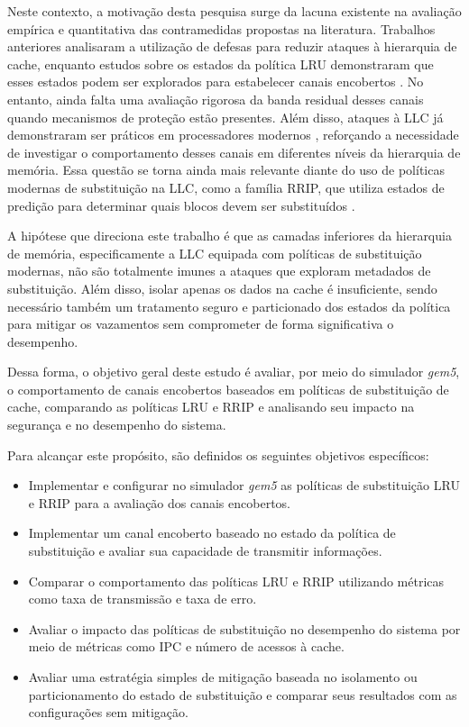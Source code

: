 \documentclass[12pt]{article}
\begin{document}
Neste contexto, a motivação desta pesquisa surge da lacuna existente na avaliação empírica e quantitativa das contramedidas propostas na literatura. Trabalhos anteriores analisaram a utilização de defesas para reduzir ataques à hierarquia de cache, enquanto estudos sobre os estados da política LRU demonstraram que esses estados podem ser explorados para estabelecer canais encobertos \cite{9354935,9065598}. No entanto, ainda falta uma avaliação rigorosa da banda residual desses canais quando mecanismos de proteção estão presentes. Além disso, ataques à LLC já demonstraram ser práticos em processadores modernos \cite{7163050}, reforçando a necessidade de investigar o comportamento desses canais em diferentes níveis da hierarquia de memória. Essa questão se torna ainda mais relevante diante do uso de políticas modernas de substituição na LLC, como a família RRIP, que utiliza estados de predição para determinar quais blocos devem ser substituídos \cite{10.1145/1815961.1815971}.

A hipótese que direciona este trabalho é que as camadas inferiores da hierarquia de memória, especificamente a LLC equipada com políticas de substituição modernas, não são totalmente imunes a ataques que exploram metadados de substituição. Além disso, isolar apenas os dados na cache é insuficiente, sendo necessário também um tratamento seguro e particionado dos estados da política para mitigar os vazamentos sem comprometer de forma significativa o desempenho.

Dessa forma, o objetivo geral deste estudo é avaliar, por meio do simulador
\textit{gem5}, o comportamento de canais encobertos baseados em políticas de
substituição de cache, comparando as políticas LRU e RRIP e analisando seu
impacto na segurança e no desempenho do sistema.

Para alcançar este propósito, são definidos os seguintes objetivos específicos:

\begin{itemize}
    \item Implementar e configurar no simulador \textit{gem5} as políticas de
    substituição LRU e RRIP para a avaliação dos canais encobertos.

    \item Implementar um canal encoberto baseado no estado da política de
    substituição e avaliar sua capacidade de transmitir informações.

    \item Comparar o comportamento das políticas LRU e RRIP utilizando métricas
    como taxa de transmissão e taxa de erro.

    \item Avaliar o impacto das políticas de substituição no desempenho do
    sistema por meio de métricas como IPC e número de acessos à cache.

    \item Avaliar uma estratégia simples de mitigação baseada no isolamento ou
    particionamento do estado de substituição e comparar seus resultados com
    as configurações sem mitigação.
\end{itemize}
\end{document}
